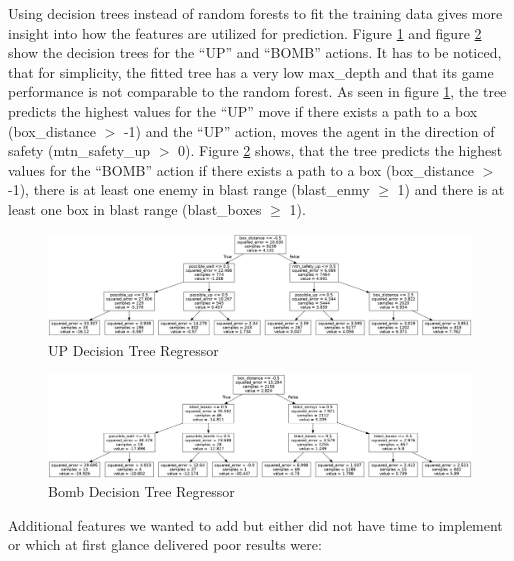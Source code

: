 \documentclass{article}
\begin{document}
Using decision trees instead of random forests to fit the training data gives more insight into how the features are utilized for prediction. Figure \ref{up_decision_tree} and figure \ref{bomb_decision_tree} show the decision trees for the “UP” and “BOMB” actions. It has to be noticed, that for simplicity, the fitted tree has a very low max\_depth and that its game performance is not comparable to the random forest. As seen in figure \ref{up_decision_tree}, the tree predicts the highest values for the “UP” move if there exists a path to a box (box\_distance $>$ -1) and the “UP” action, moves the agent in the direction of safety (mtn\_safety\_up $>$ 0). Figure \ref{bomb_decision_tree} shows, that the tree predicts the highest values for the “BOMB” action if there exists a path to a box (box\_distance $>$ -1), there is at least one enemy in blast range (blast\_enmy $\geq$ 1) and there is at least one box in blast range (blast\_boxes $\geq$ 1).

\begin{figure}[h]
\includegraphics[width=\textwidth]{plots/UP_tree.png}
\caption{UP Decision Tree Regressor}
\label{up_decision_tree}
\end{figure}


\begin{figure}[h]
\includegraphics[width=\textwidth]{plots/BOMB_tree.png}
\caption{Bomb Decision Tree Regressor}
\label{bomb_decision_tree}
\end{figure}


Additional features we wanted to add but either did not have time to implement or which at first glance delivered poor results were:
\end{document}
